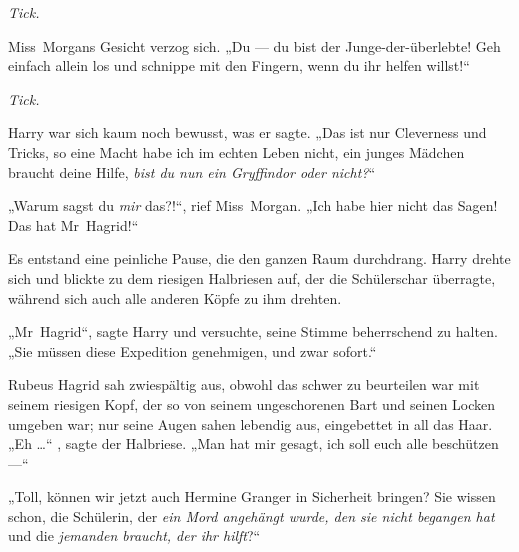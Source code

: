 \emph{Tick.}

Miss~Morgans Gesicht verzog sich.
„Du — du bist der Junge-der-überlebte! Geh einfach allein los und schnippe mit den Fingern, wenn du ihr helfen willst!“

\emph{Tick.}

Harry war sich kaum noch bewusst, was er sagte.
„Das ist nur Cleverness und Tricks, so eine Macht habe ich im echten Leben nicht, ein junges Mädchen braucht deine Hilfe, \emph{bist du nun ein Gryffindor oder nicht?}“

„Warum sagst du \emph{mir} das?!“, rief Miss~Morgan.
„Ich habe hier nicht das Sagen! Das hat Mr~Hagrid!“


Es entstand eine peinliche Pause, die den ganzen Raum durchdrang. Harry drehte sich und blickte zu dem riesigen Halbriesen auf, der die Schülerschar überragte, während sich auch alle anderen Köpfe zu ihm drehten.

„Mr~Hagrid“, sagte Harry und versuchte, seine Stimme beherrschend zu halten.
„Sie müssen diese Expedition genehmigen, und zwar sofort.“

Rubeus Hagrid sah zwiespältig aus, obwohl das schwer zu beurteilen war mit seinem riesigen Kopf, der so von seinem ungeschorenen Bart und seinen Locken umgeben war; nur seine Augen sahen lebendig aus, eingebettet in all das Haar.
„Eh …“ , sagte der Halbriese.
„Man hat mir gesagt, ich soll euch alle beschützen —“

„Toll, können wir jetzt auch Hermine Granger in Sicherheit bringen? Sie wissen schon, die Schülerin, der \emph{ein Mord angehängt wurde, den sie nicht begangen hat} und die \emph{jemanden braucht, der ihr hilft}?“

